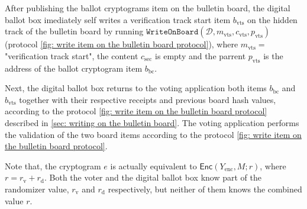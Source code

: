 After publishing the ballot cryptograms item on the bulletin board, the digital ballot box imediately self writes a verification track start item $b_\mathrm{vts}$ on the hidden track of the bulletin board by running $\mathtt{WriteOnBoard}(\mathcal{D}, m_\mathrm{vts}, c_\mathrm{vts}, p_\mathrm{vts})$ (protocol \ref{fig: write item on the bulletin board protocol}), where $m_\mathrm{vts} =$ "verification track start", the content $c_\mathrm{sec}$ is empty and the parrent $p_\mathrm{vts}$ is the address of the ballot cryptogram item $b_\mathrm{bc}$. 

Next, the digital ballot box returns to the voting application both items $b_\mathrm{bc}$ and $b_\mathrm{vts}$ together with their respective receipts and previous board hash values, according to the protocol \ref{fig: write item on the bulletin board protocol} described in \cref{sec: writing on the bulletin board}. The voting application performs the validation of the two board items according to the protocol \ref{fig: write item on the bulletin board protocol}.

Note that, the cryptogram $e$ is actually equivalent to $\mathsf{Enc}(Y_\mathrm{enc}, M; r)$, where $r = r_\mathrm{v} + r_\mathrm{d}$. Both the voter and the digital ballot box know part of the randomizer value, $r_\mathrm{v}$ and $r_\mathrm{d}$ respectively, but neither of them knows the combined value $r$.


\color{orange}
